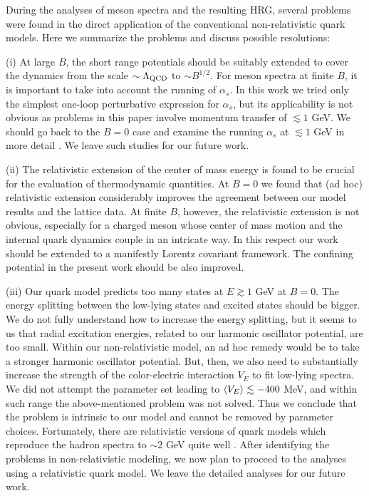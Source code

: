 During the analyses of meson spectra and the resulting HRG, several problems were found in the direct application of the conventional non-relativistic quark models.
Here we summarize the problems and discuss possible resolutions:

(i) At large $B$, the short range potentials should be suitably extended to cover the dynamics from the scale $\sim \Lambda_{\rm QCD}$ to $\sim B^{1/2}$.
For meson spectra at finite $B$, it is important to take into account the running of $\alpha_s$.
In this work we tried only the simplest one-loop perturbative expression for $\alpha_s$,
but its applicability is not obvious as problems in this paper involve momentum transfer of $\lesssim 1$ GeV.
We should go back to the $B=0$ case and examine the running $\alpha_s$ at $\lesssim 1$ GeV in more detail \cite{Deur:2016tte}.
We leave such studies for our future work.


(ii) The relativistic extension of the center of mass energy is found to be crucial for the evaluation of thermodynamic quantities.
At $B=0$ we found that (ad hoc) relativistic extension considerably improves the agreement between our model results and the lattice data.
At finite $B$, however, the relativistic extension is not obvious, 
especially for a charged meson whose center of mass motion and the internal quark dynamics couple in an intricate way.
In this respect our work should be extended to a manifestly Lorentz covariant framework.
The confining potential in the present work should be also improved.


(iii) Our quark model predicts too many states at $E\gtrsim 1$ GeV at $B=0$.
The energy splitting between the low-lying states and excited states should be bigger.
We do not fully understand how to increase the energy splitting, 
but it seems to us that radial excitation energies,
related to our harmonic oscillator potential, are too small. 
Within our non-relativistic model, 
an ad hoc remedy would be to take a stronger harmonic oscillator potential.
But, then, we also need to substantially increase the strength of the color-electric interaction $V_E$ to fit low-lying spectra.
We did not attempt the parameter set leading to $\langle V_E \rangle \lesssim -400$ MeV,
and within such range the above-mentioned problem was not solved.
Thus we conclude that the problem is intrinsic to our model and cannot be removed by parameter choices.
Fortunately, there are relativistic versions of quark models which reproduce the hadron spectra to $\sim 2$ GeV quite well \cite{Ebert:2009ub}.
After identifying the problems in non-relativistic modeling, we now plan to proceed to the analyses using a relativistic quark model.
We leave the detailed analyses for our future work.







